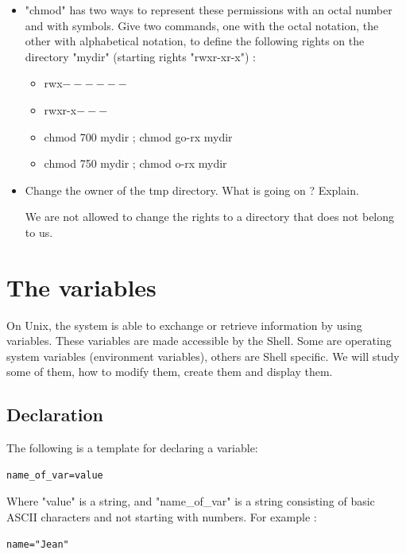 \documentclass[11pt]{article}
\begin{document}
\begin{itemize}
\begin{solution}
\end{solution}
 \item "chmod" has two ways to represent these permissions with an octal number and with symbols.
Give two commands, one with the octal notation, the other with alphabetical notation, to define the
following rights on the directory "mydir" (starting rights "rwxr-xr-x") :
 \begin{itemize}
  \item rwx$------$
  \item rwxr-x$---$
 \end{itemize}
\begin{solution}
 \begin{itemize}
  \item chmod 700 mydir ; chmod go-rx mydir
  \item chmod 750 mydir ; chmod o-rx mydir
 \end{itemize}
\end{solution}
 \item Change the owner of the tmp directory. What is going on ? Explain.
\begin{solution}
We are not allowed to change the rights to a directory that does not belong to us.
\end{solution}
\end{itemize}

\section{The variables}
On Unix, the system is able to exchange or retrieve information by using variables. These variables are made accessible by the Shell. Some are operating system variables (environment variables), others are Shell specific.
We will study some of them, how to modify them, create them and display them.

\subsection{Declaration}

The following is a template for declaring a variable:

\begin{lstlisting}
name_of_var=value
\end{lstlisting}

Where "value" is a string, and "name\_of\_var" is a string consisting of basic ASCII characters and not starting with numbers. For example :

\begin{lstlisting}
name="Jean"
\end{lstlisting}
\end{document}
